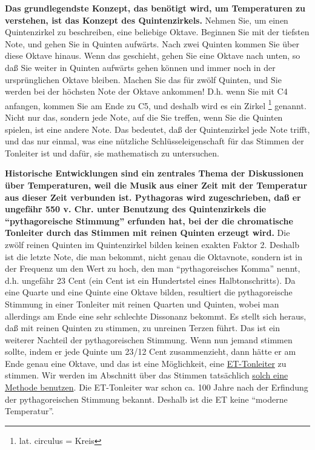 \textbf{Das grundlegendste Konzept, das benötigt wird, um Temperaturen zu verstehen, ist das Konzept des Quintenzirkels.}
 Nehmen Sie, um einen Quintenzirkel zu beschreiben, eine beliebige Oktave.
 Beginnen Sie mit der tiefsten Note, und gehen Sie in Quinten aufwärts.
 Nach zwei Quinten kommen Sie über diese Oktave hinaus.
 Wenn das geschieht, gehen Sie eine Oktave nach unten, so daß Sie weiter in Quinten aufwärts gehen können und immer noch in der ursprünglichen Oktave bleiben.
 Machen Sie das für zwölf Quinten, und Sie werden bei der höchsten Note der Oktave ankommen!
 D.h. wenn Sie mit C4 anfangen, kommen Sie am Ende zu C5, und deshalb wird es ein Zirkel \footnote{lat. circulus = Kreis} genannt.
 Nicht nur das, sondern jede Note, auf die Sie treffen, wenn Sie die Quinten spielen, ist eine andere Note.
 Das bedeutet, daß der Quintenzirkel jede Note trifft, und das nur einmal, was eine nützliche Schlüsseleigenschaft für das Stimmen der Tonleiter ist und dafür, sie mathematisch zu untersuchen.
 \hypertarget{c2_2_hist}{}

\textbf{Historische Entwicklungen sind ein zentrales Thema der Diskussionen über Temperaturen, weil die Musik aus einer Zeit mit der Temperatur aus dieser Zeit verbunden ist.
 Pythagoras wird zugeschrieben, daß er ungefähr 550 v. Chr. unter Benutzung des Quintenzirkels die \enquote{pythagoreische Stimmung} erfunden hat, bei der die chromatische Tonleiter durch das Stimmen mit reinen Quinten erzeugt wird.}
 Die zwölf reinen Quinten im Quintenzirkel bilden keinen exakten Faktor 2.
 Deshalb ist die letzte Note, die man bekommt, nicht genau die Oktavnote, sondern ist in der Frequenz um den Wert zu hoch, den man \enquote{pythagoreisches Komma} nennt, d.h. ungefähr 23 Cent (ein Cent ist ein Hundertstel eines Halbtonschritts).
 Da eine Quarte und eine Quinte eine Oktave bilden, resultiert die pythagoreische Stimmung in einer Tonleiter mit reinen Quarten und Quinten, wobei man allerdings am Ende eine sehr schlechte Dissonanz bekommt.
 Es stellt sich heraus, daß mit reinen Quinten zu stimmen, zu unreinen Terzen führt.
 Das ist ein weiterer Nachteil der pythagoreischen Stimmung.
 Wenn nun jemand stimmen sollte, indem er jede Quinte um 23/12 Cent zusammenzieht, dann hätte er am Ende genau eine Oktave, und das ist eine Möglichkeit, eine \hyperlink{et1}{ET-Tonleiter} zu stimmen.
 Wir werden im Abschnitt über das Stimmen tatsächlich \hyperlink{c2_6_et}{solch eine Methode benutzen}.
 Die ET-Tonleiter war schon ca. 100 Jahre nach der Erfindung der pythagoreischen Stimmung bekannt.
 Deshalb ist die ET keine \enquote{moderne Temperatur}.
 

